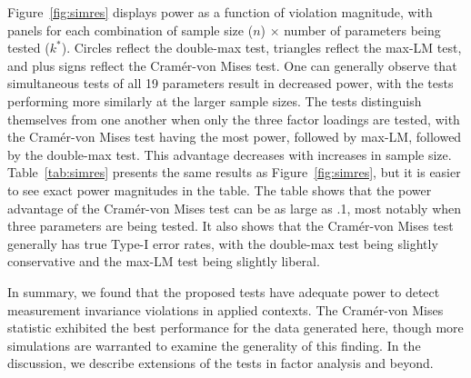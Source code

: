\documentclass[man]{apa}
\begin{document}
Figure~\ref{fig:simres} displays power as a function of violation
magnitude, with panels for each combination of sample size ($n$) $\times$
number of parameters being tested ($k^{\ast}$).  
Circles reflect the double-max test, triangles reflect the max-LM
test, and plus signs reflect the Cram{\'e}r-von Mises test.  One can
generally observe that simultaneous tests of all 19 parameters
result in decreased power, with the tests performing more similarly at
the larger sample sizes.  The tests distinguish themselves from one
another when only the three factor loadings are tested, with the
Cram\'{e}r-von Mises test having the most power, followed by max-LM,
followed by the double-max test.  This advantage decreases with
increases in sample size.  
Table~\ref{tab:simres} presents the same results as
Figure~\ref{fig:simres}, but it is easier to see exact power
magnitudes in the table.
The table shows that the
power advantage of the Cram\'{e}r-von
Mises test can be as large as .1, most notably when three parameters
are being tested.
  It also shows that the Cram\'{e}r-von Mises test generally
has true Type-I error rates, with the double-max test being slightly
conservative and the max-LM test being slightly liberal.

In summary, we found that the proposed tests have adequate power to detect
measurement invariance violations in applied contexts.  The 
Cram\'{e}r-von Mises statistic exhibited the best performance for the
data generated here, though more simulations are warranted to examine
the generality of this finding.
In the discussion, we describe extensions of the tests in factor
analysis and beyond.
\end{document}
